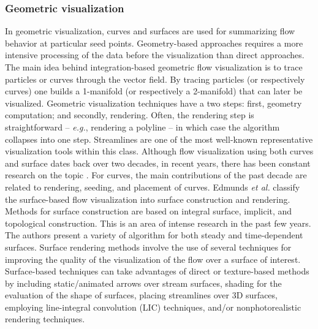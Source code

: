\subsubsection{Geometric visualization} 
%
In geometric visualization, curves and surfaces are used for summarizing flow behavior at particular seed points.
%
Geometry-based approaches requires a more intensive processing of the data before the visualization than direct approaches. 
%
The main idea behind integration-based geometric flow visualization is to trace particles or curves through the vector field. 
%
By tracing particles (or respectively curves) one builds a 1-manifold (or respectively a 2-manifold) that can later be visualized.
%
Geometric visualization techniques have a two steps: first, geometry computation; and secondly, rendering. 
%
Often, the rendering step is straightforward -- \emph{e.g.}, rendering a polyline -- in which case the algorithm collapses into one step.
%
Streamlines are one of the most well-known representative visualization tools within this class. 
%
Although flow visualization using both curves and surface dates back over two decades, in recent years, there has been constant research on the topic \cite{Edmunds2012974}. 
%
%
For curves, the main contributions of the past decade are related to rendering, seeding, and placement of curves.
%
Edmunds \emph{et al.} \cite{Edmunds2012974} classify the surface-based flow visualization into surface construction and rendering. 
%
Methods for surface construction are based on integral surface, implicit, and topological construction. 
%
This is an area of intense research in the past few years.
%
The authors present a variety of algorithm for both steady and time-dependent surfaces. 
%
Surface rendering methods involve the use of several techniques for improving the quality of the visualization of the flow over a surface of interest. 
%
Surface-based techniques can take advantages of direct or texture-based methods by including static/animated arrows over stream surfaces, shading for the evaluation of the shape of surfaces, placing streamlines over 3D surfaces, employing line-integral convolution (LIC) techniques, and/or nonphotorealistic rendering techniques.

